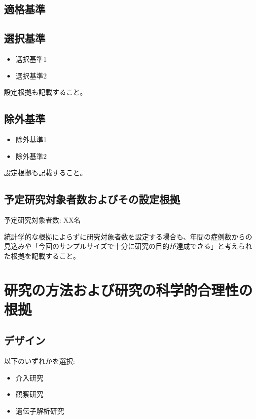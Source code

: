 \documentclass{kyodai-protocol}
\begin{document}
\subsection{適格基準}

\subsection{選択基準}
\begin{itemize}
\item 選択基準1
\item 選択基準2
\end{itemize}

設定根拠も記載すること。

\subsection{除外基準}
\begin{itemize}
\item 除外基準1
\item 除外基準2
\end{itemize}

設定根拠も記載すること。

\subsection{予定研究対象者数およびその設定根拠}

予定研究対象者数: XX名

統計学的な根拠によらずに研究対象者数を設定する場合も、年間の症例数からの見込みや「今回のサンプルサイズで十分に研究の目的が達成できる」と考えられた根拠を記載すること。

\section{研究の方法および研究の科学的合理性の根拠}
\label{sec:methods}

\subsection{デザイン}

以下のいずれかを選択:
\begin{itemize}
\item 介入研究
\item 観察研究
\item 遺伝子解析研究
\end{itemize}
\end{document}

